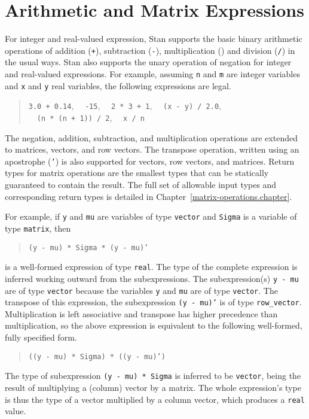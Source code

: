 \documentclass[10pt]{report}
\newcommand{\Stan}{Stan\xspace}
\newcommand{\code}[1]{{\tt #1}}
\newcommand{\refchapter}[1]{Chapter~\ref{#1.chapter}}
\begin{document}
\section{Arithmetic and Matrix Expressions}

For integer and real-valued expression, \Stan supports the basic
binary arithmetic operations of addition (\code{+}), subtraction
(\code{-}), multiplication (\code{*}) and division (\code{/}) in the
usual ways.  \Stan also supports the unary operation of negation for
integer and real-valued expressions.  For example, assuming \code{n}
and \code{m} are integer variables and \code{x} and \code{y} real
variables, the following expressions are legal.
\begin{quote}
\code{3.0 + 0.14}, 
\ \ \code{-15},
\ \ \code{2 * 3 + 1}, 
\ \ \code{(x - y) / 2.0},
\\
\ \ \code{(n * (n + 1)) / 2},
\ \ \code{x / n}
\end{quote}
%
The negation, addition, subtraction, and multiplication operations are
extended to matrices, vectors, and row vectors.  The transpose
operation, written using an apostrophe (\code{'}) is also supported
for vectors, row vectors, and matrices.  Return types for matrix
operations are the smallest types that can be statically guaranteed to
contain the result.  The full set of allowable input types and
corresponding return types is detailed in
\refchapter{matrix-operations}.

For example, if \code{y} and \code{mu} are variables of type
\code{vector} and \code{Sigma} is a variable of type \code{matrix},
then
%
\begin{quote}
\code{(y - mu) * Sigma * (y - mu)'}
\end{quote}
%
is a well-formed expression of type \code{real}.  The type of the
complete expression is inferred working outward from the
subexpressions.  The subexpression(s) \code{y - mu} are of type
\code{vector} because the variables \code{y} and \code{mu} are of type
\code{vector}.  The transpose of this expression, the subexpression
\code{(y - mu)'} is of type \code{row\_vector}.  Multiplication is
left associative and transpose has higher precedence than
multiplication, so the above expression is equivalent to the following
well-formed, fully specified form.
%
\begin{quote}
\code{((y - mu) * Sigma) * ((y - mu)')}
\end{quote}
%
The type of subexpression \code{(y - mu) * Sigma} is inferred to be
\code{vector}, being the result of multiplying a (column) vector by a
matrix.  The whole expression's type is thus the type of a vector
multiplied by a column vector, which produces a \code{real} value.
\end{document}
